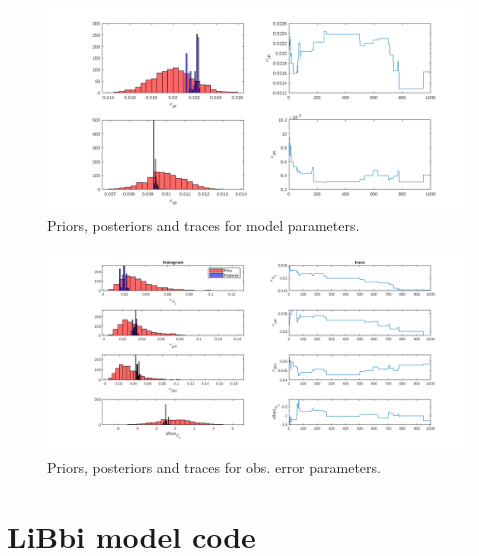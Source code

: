 \documentclass{ruthesis}
\begin{document}
\begin{figure}
	\centerline{\includegraphics[width=1.3\textwidth]{images_microalgae/plots/parameters_model2}}
	\caption[.]{Priors, posteriors and traces for model parameters.}
	\label{fig:pos_parameters_model2}
\end{figure}

\begin{figure}
	\centerline{\includegraphics[width=1.3\textwidth]{images_microalgae/plots/parameters_obserror}}
	\caption[.]{Priors, posteriors and traces for obs. error parameters.}
	\label{fig:pos_parameters_obserror}
\end{figure}




\appendix

\chapter{LiBbi model code}\label{appendix_micro_libbi_code}
\end{document}
